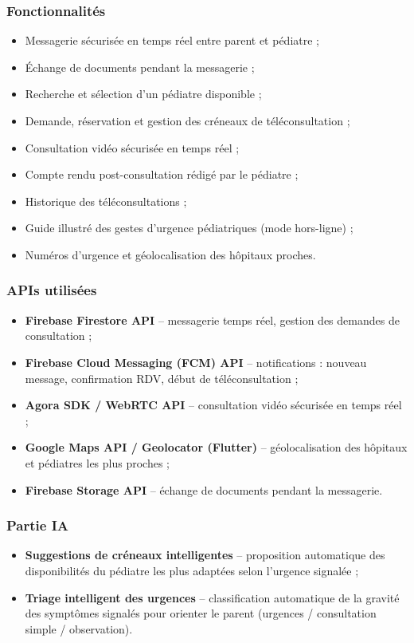 \documentclass[11pt,a4paper]{article}
\begin{document}
\subsubsection*{Fonctionnalités}
\begin{itemize}
  \item Messagerie sécurisée en temps réel entre parent et pédiatre ;
  \item Échange de documents pendant la messagerie ;
  \item Recherche et sélection d'un pédiatre disponible ;
  \item Demande, réservation et gestion des créneaux de téléconsultation ;
  \item Consultation vidéo sécurisée en temps réel ;
  \item Compte rendu post-consultation rédigé par le pédiatre ;
  \item Historique des téléconsultations ;
  \item Guide illustré des gestes d'urgence pédiatriques (mode hors-ligne) ;
  \item Numéros d'urgence et géolocalisation des hôpitaux proches.
\end{itemize}

\subsubsection*{APIs utilisées}
\begin{itemize}
  \item \textbf{Firebase Firestore API} -- messagerie temps réel, gestion des demandes de consultation ;
  \item \textbf{Firebase Cloud Messaging (FCM) API} -- notifications : nouveau message, confirmation RDV, début de téléconsultation ;
  \item \textbf{Agora SDK / WebRTC API} -- consultation vidéo sécurisée en temps réel ;
  \item \textbf{Google Maps API / Geolocator (Flutter)} -- géolocalisation des hôpitaux et pédiatres les plus proches ;
  \item \textbf{Firebase Storage API} -- échange de documents pendant la messagerie.
\end{itemize}

\subsubsection*{Partie IA}
\begin{itemize}
  \item \textbf{Suggestions de créneaux intelligentes} -- proposition automatique des disponibilités du pédiatre les plus adaptées selon l'urgence signalée ;
  \item \textbf{Triage intelligent des urgences} -- classification automatique de la gravité des symptômes signalés pour orienter le parent (urgences / consultation simple / observation).
\end{itemize}
\end{document}
